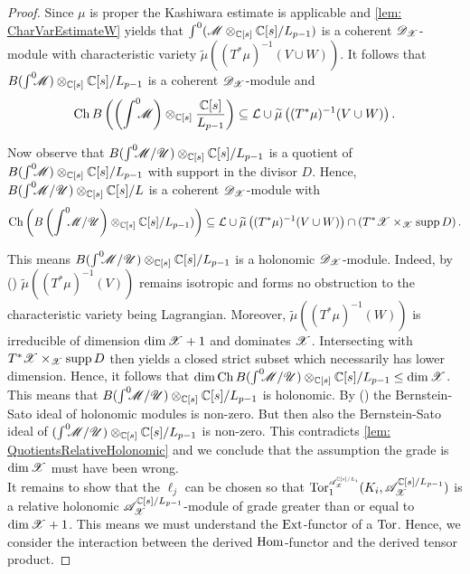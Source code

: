 \begin{proof}
  Since $\mu$ is proper the Kashiwara estimate is applicable and \cref{lem: CharVarEstimateW} yields that $\int^0(\mathscr{M}\otimes_{\mathbb{C}[s]} \mathbb{C}[s]/L_{p-1})$ is a coherent $\mathscr{D}_{\mathscr{X}}$-module with characteristic variety $\widetilde{\mu}\left((T^*\mu)^{-1}(V\cup W)\right)$.
  It follows that $B(\int^0 \mkern -8mu\mathscr{M})\otimes_{\mathbb{C}[s]}\mathbb{C}[s]/L_{p-1}$ is a coherent $\mathscr{D}_{\mathscr{X}}$-module
  and
  $$ \operatorname{Ch} B \left(\left(\int^0 \mkern -8mu\mathscr{M}\right)\otimes_{\mathbb{C}[s]}\frac{\mathbb{C}[s]}{L_{p-1}}\right)\subseteq \mathcal{L} \cup \widetilde{\mu}\left((T^*\mu)^{-1}(V\cup W)\right).$$

  Now observe that $B(\int^0 \mkern -8mu\mathscr{M}/ \mathscr{U})\otimes_{\mathbb{C}[s]}\mathbb{C}[s]/L_{p-1}$ is a quotient of $B(\int^0 \mkern -8mu\mathscr{M}) \otimes_{\mathbb{C}[s]} \mathbb{C}[s]/L_{p-1}$ with support in the divisor $D$.
  Hence, $B(\int^0 \mkern -8mu\mathscr{M}/ \mathscr{U})\otimes_{\mathbb{C}[s]}\mathbb{C}[s]/L$ is a coherent $\mathscr{D}_{\mathscr{X}}$-module with
  $$\operatorname{Ch}\left( B\left(\int^0 \mkern -8mu\mathscr{M}/ \mathscr{U}\right)\otimes_{\mathbb{C}[s]}\mathbb{C}[s]/L_{p-1}) \right)\subseteq \mathcal{L} \cup \widetilde{\mu}\left((T^*\mu)^{-1}(V\cup W)\right) \cap \left(T^*\mathscr{X}\times_{\mathscr{X}} \operatorname{supp} D\right).$$

  This means $B(\int^0 \mkern -8mu\mathscr{M}/ \mathscr{U})\otimes_{\mathbb{C}[s]}\mathbb{C}[s]/L_{p-1}$ is a holonomic $\mathscr{D}_{\mathscr{X}}$-module.
  Indeed, by () $\widetilde{\mu}((T^*\mu)^{-1}(V))$ remains isotropic and forms no obstruction to the characteristic variety being Lagrangian.
  Moreover, $\widetilde{\mu}((T^*\mu)^{-1}(W))$ is irreducible of dimension $\dim \mathscr{X}+1$ and dominates $\mathscr{X}$.
  Intersecting with $T^*\mathscr{X}\times_{\mathscr{X}} \operatorname{supp} D$ then yields a closed strict subset which necessarily has lower dimension.
  Hence, it follows that $\dim \operatorname{Ch} B(\int^0 \mkern -8mu\mathscr{M}/ \mathscr{U})\otimes_{\mathbb{C}[s]}\mathbb{C}[s]/L_{p-1} \leq \dim \mathscr{X}$.
  This means that $B(\int^0 \mkern -8mu\mathscr{M}/ \mathscr{U})\otimes_{\mathbb{C}[s]}\mathbb{C}[s]/L_{p-1}$ is holonomic.
  By () the Bernstein-Sato ideal of holonomic modules is non-zero.
  But then also the Bernstein-Sato ideal of $(\int^0 \mkern -8mu\mathscr{M}/ \mathscr{U})\otimes_{\mathbb{C}[s]}\mathbb{C}[s]/L_{p-1}$ is non-zero.
  This contradicts \cref{lem: QuotientsRelativeHolonomic} and we conclude that the assumption the grade is $\dim \mathscr{X}$ must have been wrong.\\

  It remains to show that the $\ell_j$ can be chosen so that $\Tr{\A_\X^{\C[s]/L_i} }{1}(K_i, \A_\X^{\C[s]/L_{p-1}})$ is a relative holonomic $\mathscr{A}_{\mathscr{X}}^{\mathbb{C}[s]/L_{p-1}}$-module of grade greater than or equal to $\dim \mathscr{X}+1$.
  This means we must understand the $\operatorname{Ext}$-functor of a $\operatorname{Tor}$.
  Hence, we consider the interaction between the derived $\operatorname{Hom}$-functor and the derived tensor product.


\end{proof}
